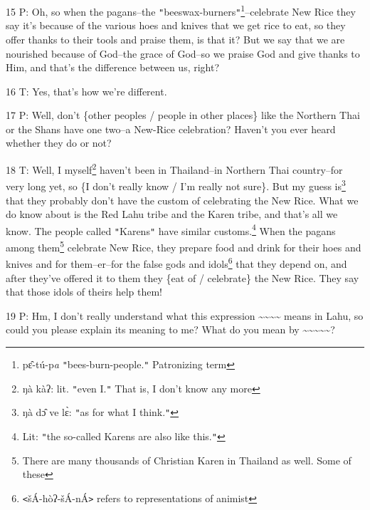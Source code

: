 15 P: Oh, so when the pagans--the \texttt{"}beeswax-burners\texttt{"}\footnote{pɛ̂-tú-p\emph{a} \texttt{"}bees-burn-people.\texttt{"} Patronizing term}--celebrate
New Rice they say it's because of the various hoes and knives that we get rice
to eat, so they offer thanks to their tools and praise them, is that it? But we
say that we are nourished because of God--the grace of God--so we praise God and
give thanks to Him, and that's the difference between us, right?

16 T: Yes, that's how we're different.

17 P: Well, don't \{other peoples / people in other places\} like the Northern
Thai or the Shans have one two--a New-Rice celebration? Haven't you ever heard
whether they do or not?

18 T: Well, I myself\footnote{ŋà kàʔ: lit. \texttt{"}even I.\texttt{"} That is, I don't know any more} haven't been in Thailand--in Northern Thai country--for
very long yet, so \{I don't really know / I'm really not sure\}. But my guess is\footnote{ŋà dɔ̂ ve lɛ̀: \texttt{"}as for what I think.\texttt{"}}
that they probably don't have the custom of celebrating the New Rice. What we do
know about is the Red Lahu tribe and the Karen tribe, and that's all we know. The
people called \texttt{"}Karens\texttt{"} have similar customs.\footnote{Lit: \texttt{"}the so-called Karens are also like this.\texttt{"}} When the pagans
among them\footnote{There are many thousands of Christian Karen in Thailand as well. Some of these} celebrate New Rice, they prepare food and drink for their hoes and
knives and for them--er--for the false gods and idols\footnote{\texttt{<}šÁ-hòʔ-šÁ-nÁ\texttt{>} refers to representations of animist} that they depend on,
and after they've offered it to them they \{eat of / celebrate\} the New Rice.
They say that those idols of theirs help them!

19 P: Hm, I don't really understand what this expression \textbf{\textasciitilde{}\textasciitilde{}\textasciitilde{}\textasciitilde{}}
means in Lahu, so could you please explain its meaning to me? What do you mean
by \textasciitilde{}\textasciitilde{}\textasciitilde{}\textasciitilde{}\textasciitilde{}?

